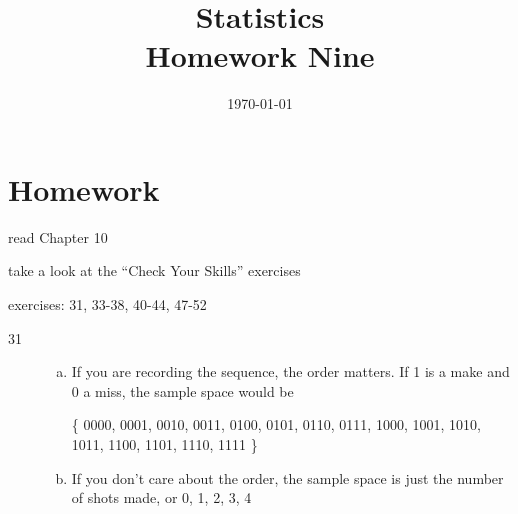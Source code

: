 \documentclass[letterpaper]{exam}
\title{Statistics \\ Homework Nine}
\date{\today}
\author{}
\begin{document}
  \maketitle

  \section{Homework}
  \ifprintanswers
  \else
    \begin{itemize*}
      \item read Chapter 10 
      \item take a look at the ``Check Your Skills'' exercises
      \item exercises: 31, 33-38, 40-44, 47-52
    \end{itemize*}
  \fi

  \ifprintanswers
    \begin{description}

      \item[31] 
        \begin{enumerate}[(a)]
          \item If you are recording the sequence, the order matters.  If 1 is a
            make and 0 a miss, the sample space would be 
            
            \{ 0000, 0001, 0010, 0011, 0100, 0101, 0110, 0111, 1000, 1001, 1010,
               1011, 1100, 1101, 1110, 1111 \}

          \item If you don't care about the order, the sample space is just the
            number of shots made, or {0, 1, 2, 3, 4 }

        \end{enumerate}





\end{description}
\end{document}
